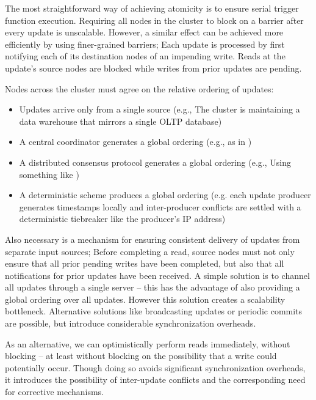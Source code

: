 The most straightforward way of achieving atomicity is to ensure serial trigger function execution.  Requiring all nodes in the cluster to block on a barrier after every update is unscalable.  However, a similar effect can be achieved more efficiently by using finer-grained barriers; Each update is processed by first notifying each of its destination nodes of an impending write.  Reads at the update's source nodes are blocked while writes from prior updates are pending.

Nodes across the cluster must agree on the relative ordering of updates:
\begin{itemize}
\item Updates arrive only from a single source (e.g., The cluster is maintaining a data warehouse that mirrors a single OLTP database)
\item A central coordinator generates a global ordering (e.g., as in \cite{peng-incremental:10})
\item A distributed consensus protocol generates a global ordering (e.g., Using something like \cite{Junqueira:2009:LTZ:1582716.1582721})
\item A deterministic scheme produces a global ordering (e.g. each update producer generates timestamps locally and inter-producer conflicts are settled with a deterministic tiebreaker like the producer's IP address)
\end{itemize}

Also necessary is a mechanism for ensuring consistent delivery of updates from separate input sources; Before completing a read, source nodes must not only ensure that all prior pending writes have been completed, but also that all notifications for prior updates have been received.  A simple solution is to channel all updates through a single server -- this has the advantage of also providing a global ordering over all updates.  However this solution creates a scalability bottleneck.  Alternative solutions like broadcasting updates or periodic commits are possible, but introduce considerable synchronization overheads.

As an alternative, we can optimistically perform reads immediately, without blocking -- at least without blocking on the possibility that a write could potentially occur.  Though doing so avoids significant synchronization overheads, it introduces the possibility of inter-update conflicts and the corresponding need for corrective mechanisms.  

